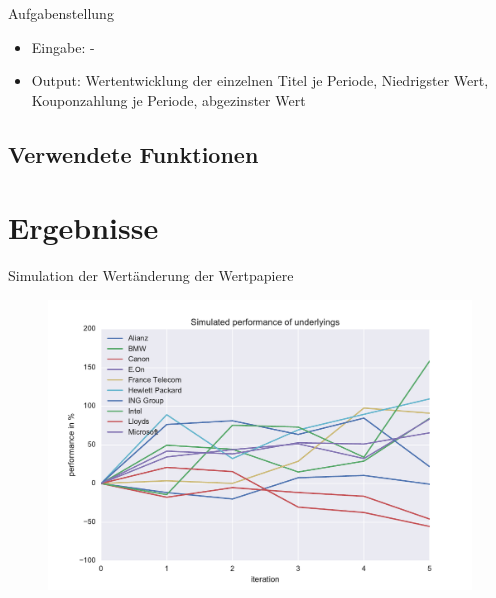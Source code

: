 \begin{frame}{Aufgabenstellung}
\begin{itemize}
  \item Eingabe: -
  \vspace{1cm}
  \item Output: Wertentwicklung der einzelnen Titel je Periode, Niedrigster Wert, Kouponzahlung je Periode, abgezinster Wert
\end{itemize}
\end{frame}

\subsection{Verwendete Funktionen}
%

\section{Ergebnisse}
\begin{frame}[fragile]{Simulation der Wertänderung der Wertpapiere}
	\vspace{-1cm}
    	\begin{figure}[h!]
    	\includegraphics[scale=0.6]{BSP26_Plot_1.pdf}
		\end{figure}
\end{frame}


